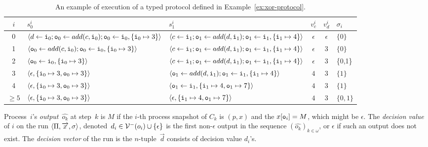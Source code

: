  \begin{sidewaystable}
   \centering
   \caption{An example of execution of a typed protocol defined in
   Example~\ref{ex:xor-protocol}.
   }
   \label{table:exec}
   \begin{tabular}{cllcc|l}
    $i$    & $s_0^i$&$s_1^i$ &$v_c^i$ &$v_d^i$ & $\sigma_i$ \\ \hline
    0      & $\langle{d\leftarrow \texttt{i}_0; \texttt{o}_0\leftarrow add(c, \texttt{i}_0); \texttt{o}_0
   \leftarrow \texttt{i}_0, \{\texttt{i}_0\mapsto 3\}}\rangle$
	& $\langle{c\leftarrow \texttt{i}_1; \texttt{o}_1\leftarrow add(d, \texttt{i}_1); \texttt{o}_1
   \leftarrow \texttt{i}_1, \{\texttt{i}_1\mapsto 4\}}\rangle$
	    & $\epsilon$
		& $\epsilon$
		    & $\{0\}$ \\ \hline
    1      & $\langle{\texttt{o}_0\leftarrow
        add(c, \texttt{i}_0); \texttt{o}_0
        \leftarrow \texttt{i}_0, \{\texttt{i}_0\mapsto 3\}}\rangle$
	& $\langle{c\leftarrow \texttt{i}_1; \texttt{o}_1\leftarrow add(d, \texttt{i}_1); \texttt{o}_1
   \leftarrow \texttt{i}_1, \{\texttt{i}_1\mapsto 4\}}\rangle$
	    & $\epsilon$
		& $3$
		    & $\{0\}$ \\ \hline
    2      & $\langle{\texttt{o}_0
        \leftarrow \texttt{i}_0, \{\texttt{i}_0\mapsto 3\}}\rangle$
        & $\langle{c\leftarrow \texttt{i}_1; \texttt{o}_1\leftarrow add(d, \texttt{i}_1); \texttt{o}_1
            \leftarrow \texttt{i}_1, \{\texttt{i}_1\mapsto 4\}}\rangle$
	    & $\epsilon$
		& $3$
		    & \{0,1\} \\ \hline
    3      & $\langle{\epsilon, \{\texttt{i}_0\mapsto 3, \texttt{o}_0 \mapsto 3\}}\rangle$
        & $\langle{\texttt{o}_1\leftarrow add(d, \texttt{i}_1); \texttt{o}_1
   \leftarrow \texttt{i}_1, \{\texttt{i}_1\mapsto 4\}}\rangle$
	    & $4$
		& $3$
		    & $\{1\}$ \\ \hline
    4      & $\langle{\epsilon, \{\texttt{i}_0\mapsto 3, \texttt{o}_0 \mapsto 3\}}\rangle$
	& $\langle{\texttt{o}_1
   \leftarrow \texttt{i}_1, \{\texttt{i}_1\mapsto 4, \texttt{o}_1\mapsto 7\}}\rangle$
	    & $4$
		& $3$
		    & $\{1\}$\\ \hline
    $\ge 5$& $\langle{\epsilon, \{\texttt{i}_0\mapsto 3, \texttt{o}_0 \mapsto 3\}}\rangle$
	& $\langle{\epsilon, \{\texttt{i}_1\mapsto 4, \texttt{o}_1\mapsto 7\}}\rangle$
	    & $4$
		& $3$
		    & $\{0,1\}$ \\ \hline
   \end{tabular}
  \end{sidewaystable}

Process~$i$'s \textit{output}~$\hat{o_k}$ at step~$k$ is
$M$ if the $i$-th process snapshot of $C_k$ is
$(p, x)$ and the $x[\texttt{o}_i] = M$, which might be $\epsilon$.
The \textit{decision value}
of $i$ on the run $\langle{\Pi,\overrightarrow x,\sigma}\rangle$,
denoted~$d_i \in \mathcal{V}^-(o_i)\cup\{\epsilon\}$
 is the first non-$\epsilon$ output in the sequence
 $\left(\hat{o_k}\right)_{k\in\omega}$,
 or
$\epsilon$ if such an output does not exist.
The \textit{decision vector} of the run is
the $n$-tuple~$\vec d$ consists of decision value $d_i$'s.

